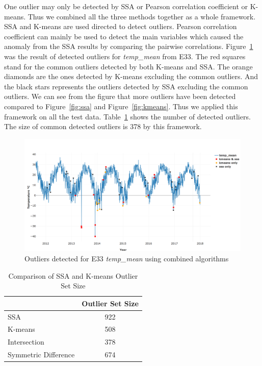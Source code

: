 \documentclass[letterpaper, 10 pt, conference]{ieeeconf}  %
\begin{document}
One outlier may only be detected by SSA or Pearson correlation coefficient or K-means. Thus we combined all the three methods together as a whole framework. SSA and K-means are used directed to detect outliers. Pearson correlation coefficient can mainly be used to detect the main variables which caused the anomaly from the SSA results by comparing the pairwise correlations. Figure~\ref{fig:combined} was the result of detected outliers for \textit{temp\_mean} from E33. The red squares stand for the common outliers detected by both K-means and SSA. The orange diamonds are the ones detected by K-means excluding the common outliers. And the black stars represents the outliers detected by SSA excluding the common outliers. We can see from the figure that more outliers have been detected compared to Figure~\ref{fig:ssa} and Figure~\ref{fig:kmeans}. Thus we applied this framework on all the test data. Table~\ref{tab:comp} shows the number of detected outliers. The size of common detected outliers is 378 by this framework.

\begin{figure}[ht]
    \centering
    \includegraphics[width=\textwidth]{combined.png}
    \caption{Outliers detected for E33 \textit{temp\_mean} using combined algorithms}
    \label{fig:combined}
\end{figure}

\begin{table}[ht]
\caption{Comparison of SSA and K-means Outlier Set Size}
\label{tab:comp}
\centering
\begin{tabular}{|l|c|}
\cline{2-2}
\multicolumn{1}{l|}{} & Outlier Set Size\\
\hline
SSA & 922\\
K-means & 508\\
Intersection & 378\\
Symmetric Difference & 674\\
\hline
\end{tabular}
\end{table}
\end{document}
